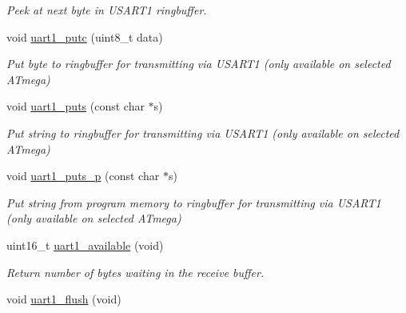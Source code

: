 \begin{DoxyCompactItemize}
\begin{DoxyCompactList}\small\item\em Peek at next byte in U\+S\+A\+R\+T1 ringbuffer. \end{DoxyCompactList}\item 
void \hyperlink{group__avr-uart_ga62da878e3872406cf82fda510487b83f}{uart1\+\_\+putc} (uint8\+\_\+t data)
\begin{DoxyCompactList}\small\item\em Put byte to ringbuffer for transmitting via U\+S\+A\+R\+T1 (only available on selected A\+Tmega) \end{DoxyCompactList}\item 
void \hyperlink{group__avr-uart_ga5568f8f3913b218fd4d0346af78831b2}{uart1\+\_\+puts} (const char $\ast$s)
\begin{DoxyCompactList}\small\item\em Put string to ringbuffer for transmitting via U\+S\+A\+R\+T1 (only available on selected A\+Tmega) \end{DoxyCompactList}\item 
void \hyperlink{group__avr-uart_ga1e8074d0a2d5922601c5db2f9777ba79}{uart1\+\_\+puts\+\_\+p} (const char $\ast$s)
\begin{DoxyCompactList}\small\item\em Put string from program memory to ringbuffer for transmitting via U\+S\+A\+R\+T1 (only available on selected A\+Tmega) \end{DoxyCompactList}\item 
\hypertarget{group__avr-uart_ga7529b13068cd91acfb2fdd0205dc5188}{}uint16\+\_\+t \hyperlink{group__avr-uart_ga7529b13068cd91acfb2fdd0205dc5188}{uart1\+\_\+available} (void)\label{group__avr-uart_ga7529b13068cd91acfb2fdd0205dc5188}

\begin{DoxyCompactList}\small\item\em Return number of bytes waiting in the receive buffer. \end{DoxyCompactList}\item 
\hypertarget{group__avr-uart_ga07f72e8f865f43b2d0725d19ecd5fb55}{}void \hyperlink{group__avr-uart_ga07f72e8f865f43b2d0725d19ecd5fb55}{uart1\+\_\+flush} (void)\label{group__avr-uart_ga07f72e8f865f43b2d0725d19ecd5fb55}


\end{DoxyCompactItemize}
